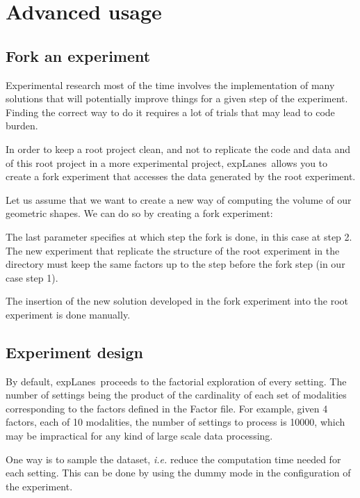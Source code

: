 \documentclass[a4paper,fleqn]{tufte-handout}
\newcommand{\explanes}{\textsf{expLanes}\ }
\begin{document}
\section{Advanced usage}
\hypertarget{advanced}{} 

\subsection{Fork an experiment}

Experimental research most of the time involves the implementation of many solutions that will potentially improve things for a given step of the experiment. Finding the correct way to do it requires a lot of trials that may lead to code burden.

In order to keep a root project clean, and not to replicate the code and data and of this root project in a more experimental project, \explanes allows you to create a fork experiment that accesses the data generated by the root experiment.

Let us assume that we want to create a new way of computing the volume of our geometric shapes. We can do so by creating a fork experiment:


The last parameter specifies at which step the fork is done, in this case at step 2.
The new experiment that replicate the structure of the root experiment in the directory  must keep the same factors up to the step before the fork step (in our case step 1).

The insertion of the new solution developed in the fork experiment into the root experiment is done manually.

\subsection{Experiment design}

By default, \explanes proceeds to the factorial exploration of every setting. The number of settings being the product of the cardinality of each set of modalities corresponding to the factors defined in the Factor file. For example, given 4 factors, each of 10 modalities, the number of settings to process is 10000, which may be impractical for any kind of large scale data processing.

One way is to sample the dataset, \textit{i.e.} reduce the computation time needed for each setting. This can be done by using the dummy mode in the configuration of the experiment.
\end{document}
